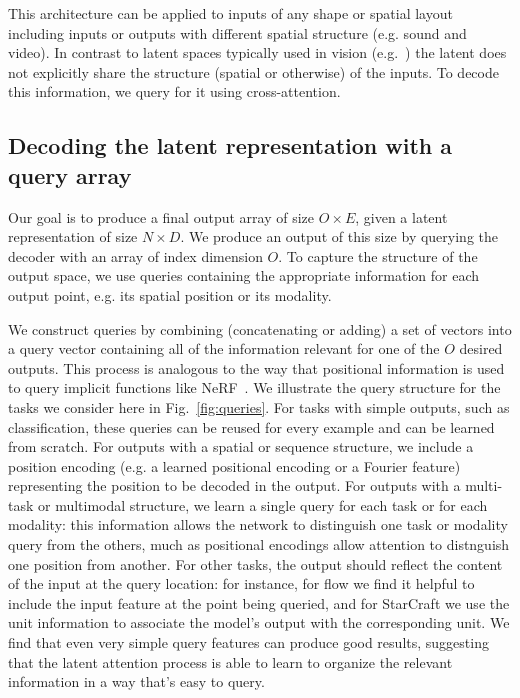 \documentclass{article} %
\begin{document}
This architecture can be applied to inputs of any shape or spatial layout including inputs or outputs with different spatial structure (e.g. sound and video). In contrast to latent spaces typically used in vision (e.g.~\citealt{ronnenberger2015convolutional}) the latent does not explicitly share the structure (spatial or otherwise) of the inputs. To decode this information, we query for it using cross-attention.

\subsection{Decoding the latent representation with a query array}
\label{sec:decode}

Our goal is to produce a final output array of size $O\times E$, given a latent representation of size $N\times D$. We produce an output of this size by querying the decoder with an array of index dimension $O$. To capture the structure of the output space, we use queries containing the appropriate information for each output point, e.g. its spatial position or its modality.

We construct queries by combining (concatenating or adding) a set of vectors into a query vector containing all of the information relevant for one of the $O$ desired outputs. This process is analogous to the way that positional information is used to query implicit functions like NeRF~\citep{mildenhall2020nerf}. We illustrate the query structure for the tasks we consider here in Fig.~\ref{fig:queries}. For tasks with simple outputs, such as classification, these queries can be reused for every example and can be learned from scratch. For outputs with a spatial or sequence structure, we include a position encoding (e.g. a learned positional encoding or a Fourier feature) representing the position to be decoded in the output. For outputs with a multi-task or multimodal structure, we learn a single query for each task or for each modality: this information allows the network to distinguish one task or modality query from the others, much as positional encodings allow attention to distnguish one position from another. For other tasks, the output should reflect the content of the input at the query location: for instance, for flow we find it helpful to include the input feature at the point being queried, and for StarCraft  we use the unit information to associate the model's output with the corresponding unit. We find that even very simple query features can produce good results, suggesting that the latent attention process is able to learn to organize the relevant information in a way that's easy to query.
\end{document}
